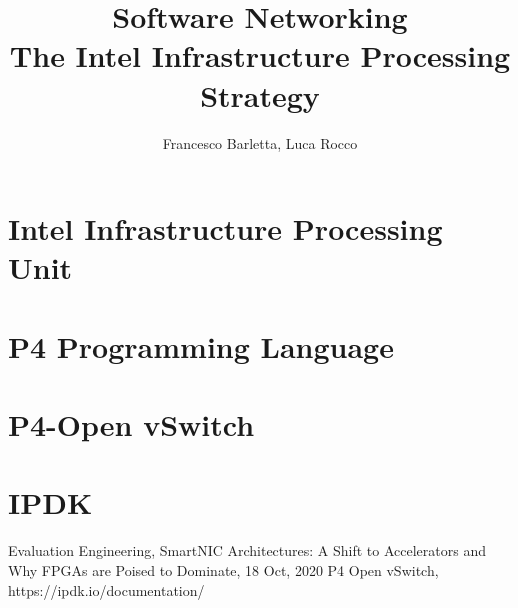 \documentclass{article}
\title{
    Software Networking \\
    \large The Intel Infrastructure Processing Strategy}
\begin{document}
\author{Francesco Barletta, Luca Rocco}

\maketitle

\tableofcontents

\clearpage

\section{Intel\raisebox {1mm}{\textregistered} Infrastructure Processing Unit}


\section{P4 Programming Language}


\section{P4-Open vSwitch}


\section{IPDK}


\clearpage

\printnoidxglossary[type=acronym]
\printacronyms

\clearpage

\begin{thebibliography}{1}
    Evaluation Engineering, SmartNIC Architectures: A Shift to Accelerators and Why FPGAs are Poised to Dominate, 18 Oct, 2020
    P4 Open vSwitch, https://ipdk.io/documentation/
\end{thebibliography}
\end{document}
